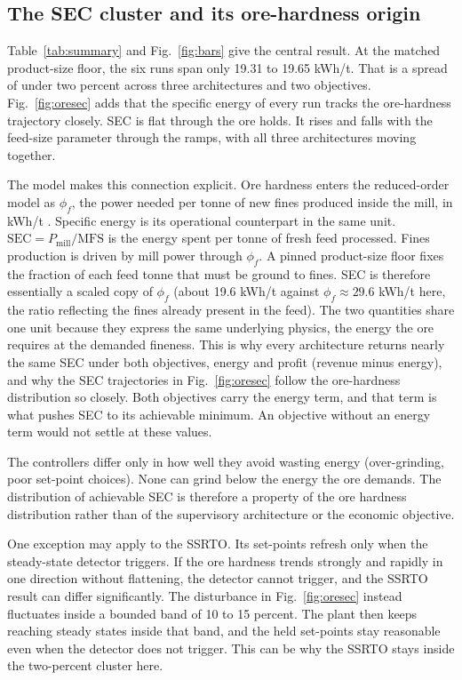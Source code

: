 \documentclass[conference]{IEEEtran}
\begin{document}
\subsection{The SEC cluster and its ore-hardness origin}

Table~\ref{tab:summary} and Fig.~\ref{fig:bars} give the central result.
At the matched product-size floor, the six runs span only 19.31 to 19.65
kWh/t. That is a spread of under two percent across three architectures
and two objectives. Fig.~\ref{fig:oresec} adds that the specific energy
of every run tracks the ore-hardness trajectory closely. SEC is flat
through the ore holds. It rises and falls with the feed-size parameter
through the ramps, with all three architectures moving together.

The model makes this connection explicit. Ore hardness enters the
reduced-order model as $\phi_f$, the power needed per tonne of new fines
produced inside the mill, in kWh/t \cite{leroux2013}. Specific energy is
its operational counterpart in the same unit.
$\mathrm{SEC}=P_{\mathrm{mill}}/\mathrm{MFS}$ is the energy spent per
tonne of fresh feed processed. Fines production is driven by mill power
through $\phi_f$. A pinned product-size floor fixes the fraction of each
feed tonne that must be ground to fines. SEC is therefore essentially a
scaled copy of $\phi_f$ (about 19.6 kWh/t against $\phi_f \approx 29.6$
kWh/t here, the ratio reflecting the fines already present in the feed).
The two quantities share one unit because they express the same
underlying physics, the energy the ore requires at the demanded fineness.
This is why every architecture returns nearly the same SEC under both
objectives, energy and profit (revenue minus energy), and why the SEC
trajectories in Fig.~\ref{fig:oresec} follow the ore-hardness
distribution so closely. Both objectives carry the energy term, and that
term is what pushes SEC to its achievable minimum. An objective without
an energy term would not settle at these values.

The controllers differ only in how well they avoid wasting energy
(over-grinding, poor set-point choices). None can grind below the energy
the ore demands. The distribution of achievable SEC is therefore a
property of the ore hardness distribution rather than of the supervisory
architecture or the economic objective.

One exception may apply to the SSRTO. Its set-points refresh only when
the steady-state detector triggers. If the ore hardness trends strongly
and rapidly in one direction without flattening, the detector cannot
trigger, and the SSRTO result can differ significantly. The disturbance
in Fig.~\ref{fig:oresec} instead fluctuates inside a bounded band of 10
to 15 percent.
The plant then keeps reaching steady states inside that band, and the
held set-points stay reasonable even when the detector does not
trigger. This can be why the SSRTO stays inside the two-percent cluster
here.
\end{document}
